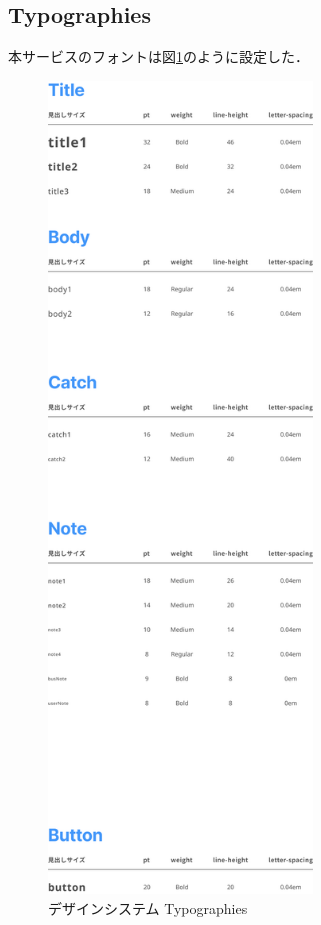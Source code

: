 \subsection{Typographies}
本サービスのフォントは図\ref{fig:typographies}のように設定した．
\begin{figure}[H]
    \centering
    \includegraphics[width=7cm]{images/typographies.png}
    \caption{デザインシステム Typographies}
    \label{fig:typographies}
\end{figure}
